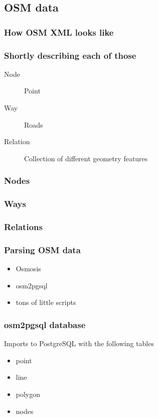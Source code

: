 \documentclass{beamer}
\begin{document}
\subsection{OSM data}

\begin{frame}[fragile]
  \frametitle{How OSM XML looks like}
  
\end{frame}

\begin{frame}
  \frametitle{Shortly describing each of those}
  \begin{description}
  \item[Node] Point
  \item[Way] Roads
  \item[Relation] Collection of different geometry features
  \end{description}
\end{frame}

\begin{frame}
  \frametitle{Nodes}
  
\end{frame}

\begin{frame}
  \frametitle{Ways}
  
\end{frame}

\begin{frame}
  \frametitle{Relations}
  
\end{frame}

\begin{frame}
  \frametitle{Parsing OSM data}
  \begin{itemize}
  \item Osmosis
  \item osm2pgsql
  \item tons of little scripts
  \end{itemize}
\end{frame}

\begin{frame}
  \frametitle{osm2pgsql database}
  Imports to PostgreSQL with the following tables
  \begin{itemize}
  \item point
  \item line
  \item polygon
  \item nodes
  \end{itemize}
\end{frame}
\end{document}
